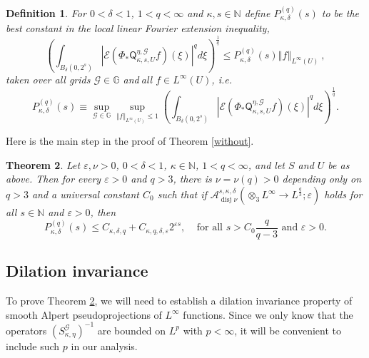 \documentclass{amsart}%
\newtheorem{theorem}{Theorem}
\theoremstyle{plain}
\newtheorem{definition}[theorem]{Definition}
\numberwithin{equation}{section}
\begin{document}
\begin{definition}
For $0<\delta<1$, $1<q<\infty$ and $\kappa,s\in\mathbb{N}$ define
$P_{\kappa,\delta}^{\left(  q\right)  }\left(  s\right)  $ to be the best
constant in the local linear Fourier extension inequality,%
\[
\left(  \int_{B_{\delta}\left(  0,2^{s}\right)  }\left\vert \mathcal{E}\left(
\Phi_{\ast}\mathsf{Q}_{\kappa,s,U}^{\eta,\mathcal{G}}f\right)  \left(
\xi\right)  \right\vert ^{q}d\xi\right)  ^{\frac{1}{q}}\leq P_{\kappa,\delta
}^{\left(  q\right)  }\left(  s\right)  \left\Vert f\right\Vert _{L^{\infty
}\left(  U\right)  }\ ,
\]
taken over all grids $\mathcal{G}\in\mathbb{G}$ and$\ $all $f\in L^{\infty
}\left(  U\right)  $, i.e.
\begin{equation}
P_{\kappa,\delta}^{\left(  q\right)  }\left(  s\right)  \equiv\sup
_{\mathcal{G}\in\mathbb{G}}\sup_{\left\Vert f\right\Vert _{L^{\infty}\left(
U\right)  }\leq1}\left(  \int_{B_{\delta}\left(  0,2^{s}\right)  }\left\vert
\mathcal{E}\left(  \Phi_{\ast}\mathsf{Q}_{\kappa,s,U}^{\eta,\mathcal{G}%
}f\right)  \left(  \xi\right)  \right\vert ^{q}d\xi\right)  ^{\frac{1}{q}%
}.\label{Q_R}%
\end{equation}

\end{definition}

Here is the main step in the proof of Theorem \ref{without}.

\begin{theorem}
\label{Loc lin}Let $\varepsilon,\nu>0$, $0<\delta<1$, $\kappa\in\mathbb{N}$,
$1<q<\infty$, and let $S$ and $U$ be as above. Then for every $\varepsilon>0$
and $q>3$, there is $\nu=\nu\left(  q\right)  >0$ depending only on $q>3$ and
a universal constant $C_{0}$ such that if $\mathcal{A}_{\operatorname*{disj}%
\nu}^{s,\kappa,\delta}\left(  \otimes_{3}L^{\infty}\rightarrow L^{\frac{q}{3}%
};\varepsilon\right)  $ holds for all $s\in\mathbb{N}$ and $\varepsilon>0$,
then%
\[
P_{\kappa,\delta}^{\left(  q\right)  }\left(  s\right)  \leq C_{\kappa
,\delta,q}+C_{\kappa,q,\delta,\varepsilon}2^{\varepsilon s}%
,\ \ \ \ \ \text{for all }s>C_{0}\frac{q}{q-3}\text{ and }\varepsilon>0.
\]

\end{theorem}

\subsection{Dilation invariance}

To prove Theorem \ref{Loc lin}, we will need to establish a dilation
invariance property of smooth Alpert pseudoprojections of $L^{\infty}$
functions. Since we only know that the operators $\left(  S_{\kappa,\eta
}^{\mathcal{G}}\right)  ^{-1}$ are bounded on $L^{p}$ with $p<\infty$, it will
be convenient to include such $p$ in our analysis.
\end{document}
